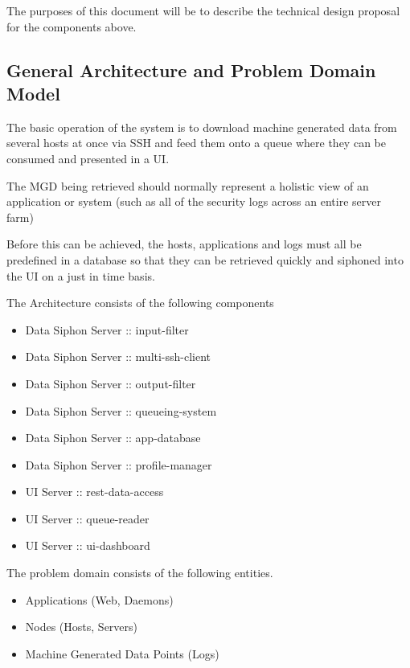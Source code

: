 \documentclass{llncs}
\begin{document}
The purposes of this document will be to describe the technical design proposal for the components above.

\subsection{General Architecture and Problem Domain Model}

The basic operation of the system is to download machine generated data from several hosts at once via SSH and feed them onto a queue where they can be consumed and presented in a UI.

The MGD being retrieved should normally represent a holistic view of an application or system (such as all of the security logs across an entire server farm)

Before this can be achieved, the hosts, applications and logs must all be predefined in a database so that they can be retrieved quickly and siphoned into the UI on a just in time basis.

The Architecture consists of the following components

\begin{itemize}
\item	Data Siphon Server :: input-filter
\item	Data Siphon Server :: multi-ssh-client
\item	Data Siphon Server :: output-filter
\item	Data Siphon Server :: queueing-system
\item	Data Siphon Server :: app-database
\item	Data Siphon Server :: profile-manager
\end{itemize}

\begin{itemize}
\item	UI Server :: rest-data-access
\item	UI Server :: queue-reader
\item	UI Server :: ui-dashboard
\end{itemize}

The problem domain consists of the following entities.

\begin{itemize}
\item	Applications (Web, Daemons)
\item	Nodes (Hosts, Servers)
\item	Machine Generated Data Points (Logs)
\end{itemize}
\end{document}
